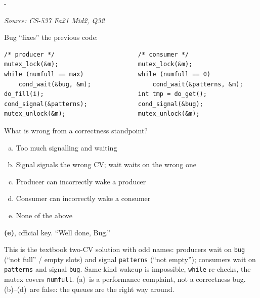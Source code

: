 \documentclass[11pt,a4paper]{article}
\makeatletter
\newcommand{\keepspace}[1]{\par\penalty-100\begingroup
  \setlength{\dimen@}{#1}\dimen@ii\pagegoal\advance\dimen@ii-\pagetotal
  \ifdim\dimen@>\dimen@ii\ifdim\dimen@ii>\z@\vfil\fi\break\fi\endgroup}
\newcounter{qn}[section]
\newenvironment{Qn}[4]{%
  \refstepcounter{qn}\keepspace{7\baselineskip}%
  \begin{tcolorbox}[qboxstyle, title={Q\thesection.\theqn\ \ [#1 \textbar\ #2]\ \ #4}]%
  {\footnotesize\color{g3}\textit{Source: #3}}\par\smallskip%
}{%
  \end{tcolorbox}%
}
\newenvironment{Sol}{%
  \begin{tcolorbox}[sboxstyle, title={Solution}]%
}{%
  \end{tcolorbox}\vspace{0.35em}%
}
\makeatother
\begin{document}
\begin{Qn}{Easy-Medium}{Lect 18}{CS-537 Fa21 Mid2, Q32}{Two CVs named \texttt{bug} and \texttt{patterns}}
Bug ``fixes'' the previous code:
\begin{lstlisting}[numbers=none]
/* producer */                       /* consumer */
mutex_lock(&m);                      mutex_lock(&m);
while (numfull == max)               while (numfull == 0)
    cond_wait(&bug, &m);                 cond_wait(&patterns, &m);
do_fill(i);                          int tmp = do_get();
cond_signal(&patterns);              cond_signal(&bug);
mutex_unlock(&m);                    mutex_unlock(&m);
\end{lstlisting}
What is wrong from a correctness standpoint?
\begin{enumerate}[(a)]
\item Too much signalling and waiting
\item Signal signals the wrong CV; wait waits on the wrong one
\item Producer can incorrectly wake a producer
\item Consumer can incorrectly wake a consumer
\item None of the above
\end{enumerate}
\end{Qn}
\begin{Sol}
\textbf{(e)}, official key. ``Well done, Bug.''

This is the textbook two-CV solution with odd names:
producers wait on \texttt{bug} (``not full'' / empty slots) and signal
\texttt{patterns} (``not empty''); consumers wait on \texttt{patterns}
and signal \texttt{bug}. Same-kind wakeup is impossible, \texttt{while}
re-checks, the mutex covers \texttt{numfull}. (a)~is a performance
complaint, not a correctness bug. (b)--(d)~are false: the queues are
the right way around.
\end{Sol}
\end{document}
